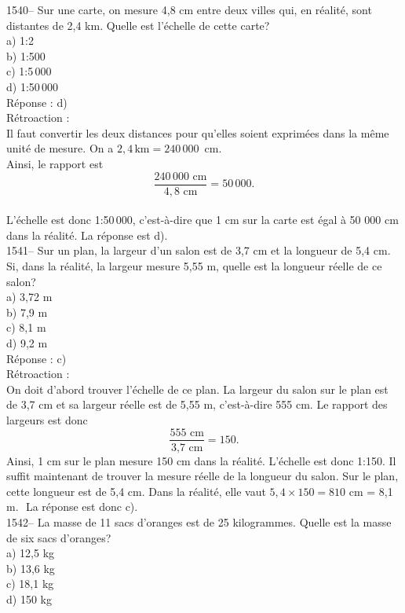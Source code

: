 1540-- Sur une carte, on mesure 4,8 cm entre deux villes qui, en
r\'ealit\'e, sont distantes de 2,4 km. Quelle est l'\'echelle de
cette carte?\\
a) 1:2 \\
b) 1:500\\
c) 1:5\,000\\
d) 1:50\,000\\

R\'eponse : d)\\

R\'etroaction :\\
Il faut convertir les deux distances pour qu'elles soient
exprim\'ees dans la m\^eme unit\'e de mesure. On a $2,4
\,{\textrm{km}}= 240\,000\,{\textrm{ cm}}.$\\ Ainsi, le rapport est
$$\frac{240\,000{\textrm{ cm}}}{4,8{\textrm{ cm}}}=50\,000.$$\\
L'\'echelle est donc 1:50\,000, c'est-\`a-dire que 1 cm sur la carte
est \'egal \`a 50 000
cm dans la r\'ealit\'e. La r\'eponse est d).\\

1541-- Sur un plan, la largeur d'un salon est de 3,7 cm et la
longueur de 5,4 cm. Si, dans la r\'ealit\'e, la largeur mesure 5,55
m, quelle est la longueur r\'eelle de ce salon?\\
a) 3,72 m\\
b) 7,9 m\\
c) 8,1 m\\
d) 9,2 m\\

R\'eponse : c)\\

R\'etroaction :\\
On doit d'abord trouver l'\'echelle de ce plan. La largeur du salon
sur le plan est de 3,7 cm et sa largeur r\'eelle est de 5,55 m,
c'est-\`a-dire 555 cm. Le rapport des largeurs est donc
$$\frac{\textrm{555 cm}}{\textrm{3,7 cm}}=150.$$ Ainsi, 1 cm sur le plan
mesure 150 cm dans la r\'ealit\'e. L'\'echelle est donc 1:150. Il
suffit maintenant de trouver la mesure r\'eelle de la longueur du
salon. Sur le plan, cette longueur est de 5,4 cm. Dans la
r\'ealit\'e, elle vaut $5,4\times 150 = 810$ cm = 8,1 m. \,\,La
r\'eponse est
donc c).\\

1542-- La masse de 11 sacs d'oranges est de 25 kilogrammes. Quelle
est la masse de six sacs d'oranges?\\
a) 12,5 kg\\
b) 13,6 kg\\
c) 18,1 kg\\
d) 150 kg\\

